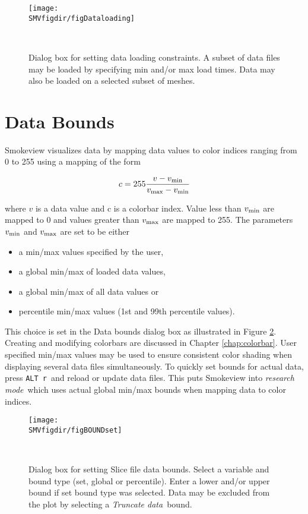 \documentclass[11pt,twoside]{book}
\begin{document}
\begin{figure}[bph]
\centerline{
\texttt{[image: \\SMVfigdir/figDataloading]}}
\caption[Dialog box for setting data loading constraints.]
{Dialog box for setting data loading constraints.
A subset of data files may be loaded by specifying min and/or max load times.
Data may also be loaded on a selected subset of meshes.
}\ \label{figDataloading}
\end{figure}

\section{Data Bounds}

Smokeview visualizes data by mapping data values to color indices
ranging from 0 to 255 using a mapping of the form

\begin{eqnarray*}
c=255 \frac{v-v_{\rm min}}{v_{\rm max}-v_{\rm min}}
\end{eqnarray*}

\noindent where $v$ is a data value and c is a colorbar index.
Value less than $v_{\rm min}$ are mapped to 0 and
values greater than $v_{\rm max}$ are mapped to 255.
The parameters $v_{\rm min}$ and $v_{\rm max}$ are set to be either
\begin{itemize}
\item a min/max values specified by the user,
\item a global min/max of loaded data values,
\item a global min/max of all data values or
\item percentile min/max values (1st and 99th percentile values).
\end{itemize}
This choice is set in the Data bounds dialog box as illustrated in Figure \ref{figBOUNDSset}.
Creating and modifying colorbars are discussed in Chapter \ref{chap:colorbar}.
User specified min/max values may be used to ensure consistent color shading when
displaying several data files simultaneously.
To quickly set bounds for actual data, press {\tt ALT r}\ and reload or update data files.
This puts Smokeview into {\em research mode}\ which uses actual global min/max bounds
when mapping data to color indices.

\begin{figure}[bph]
\centerline{
\texttt{[image: \\SMVfigdir/figBOUNDset]}}
\caption[Dialog box for setting Slice file data bounds.]
{Dialog box for setting Slice file data bounds.
Select a variable and bound type (set, global  or percentile).  Enter a lower
and/or upper bound if set bound type was selected. Data may be excluded from the plot by
selecting a {\em Truncate data}\ bound.
}\ \label{figBOUNDSset}
\end{figure}
\end{document}
